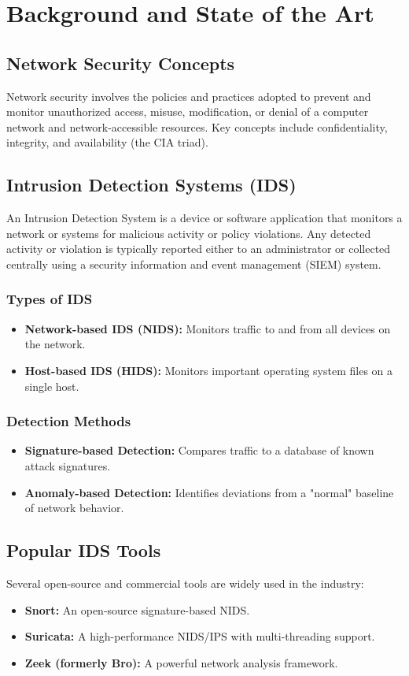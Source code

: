 \chapter{Background and State of the Art}
\label{chap:background}

\section{Network Security Concepts}
Network security involves the policies and practices adopted to prevent and monitor unauthorized access, misuse, modification, or denial of a computer network and network-accessible resources. Key concepts include confidentiality, integrity, and availability (the CIA triad).

\section{Intrusion Detection Systems (IDS)}
An Intrusion Detection System is a device or software application that monitors a network or systems for malicious activity or policy violations. Any detected activity or violation is typically reported either to an administrator or collected centrally using a security information and event management (SIEM) system.

\subsection{Types of IDS}
\begin{itemize}
    \item \textbf{Network-based IDS (NIDS):} Monitors traffic to and from all devices on the network.
    \item \textbf{Host-based IDS (HIDS):} Monitors important operating system files on a single host.
\end{itemize}

\subsection{Detection Methods}
\begin{itemize}
    \item \textbf{Signature-based Detection:} Compares traffic to a database of known attack signatures.
    \item \textbf{Anomaly-based Detection:} Identifies deviations from a "normal" baseline of network behavior.
\end{itemize}

\section{Popular IDS Tools}
Several open-source and commercial tools are widely used in the industry:
\begin{itemize}
    \item \textbf{Snort:} An open-source signature-based NIDS.
    \item \textbf{Suricata:} A high-performance NIDS/IPS with multi-threading support.
    \item \textbf{Zeek (formerly Bro):} A powerful network analysis framework.
\end{itemize}
